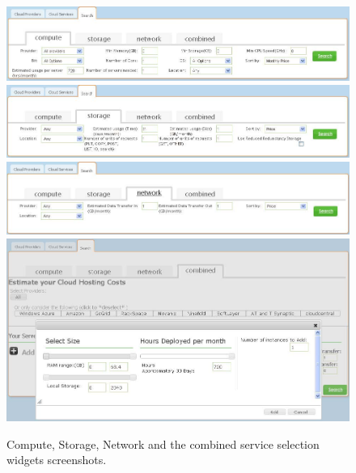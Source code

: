 \begin{figure}
  \includegraphics[width=\textwidth,keepaspectratio]{Figures/system/CloudRecommender/widget_compute.jpg}
  \includegraphics[width=\textwidth,keepaspectratio]{Figures/system/CloudRecommender/widget_storage.jpg}
  \includegraphics[width=\textwidth,keepaspectratio]{Figures/system/CloudRecommender/widget_network.jpg}
  \includegraphics[width=\textwidth,keepaspectratio]{Figures/system/CloudRecommender/widget_combined_popup.jpg}
  \caption{Compute, Storage, Network and the combined service selection widgets screenshots.}
  \label{fig:widget_screenshots}
\end{figure}

